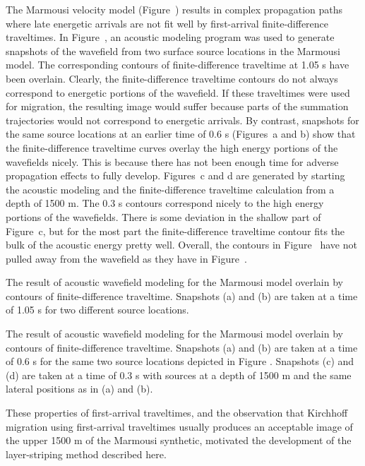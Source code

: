 The Marmousi velocity model (Figure~) results in
complex propagation paths where late energetic arrivals are not fit well 
by first-arrival finite-difference traveltimes.
In Figure~,
an acoustic modeling program was used to generate snapshots of 
the wavefield from two surface source locations in the Marmousi model.
The corresponding
contours of finite-difference traveltime at 1.05 s have been overlain.
Clearly, the finite-difference traveltime contours do not always correspond
to energetic portions of the wavefield. If these traveltimes were
used for migration, the resulting image would suffer because 
parts of the summation trajectories would not correspond to 
energetic arrivals. By contrast, snapshots for the same source locations
at an earlier time of 0.6 s (Figures~a and b)
show that the finite-difference traveltime curves overlay the
high energy portions of the wavefields nicely. This is because there 
has not been enough time for adverse propagation effects to fully develop.
Figures~c and d are generated by
starting the acoustic modeling and the finite-difference traveltime
calculation from a depth of 1500 m. The 0.3 s contours correspond nicely
to the high energy portions of the wavefields. There is some deviation
in the shallow part of Figure~c, but for the most part
the finite-difference traveltime contour fits the bulk of the acoustic 
energy pretty well. Overall, the contours in Figure~
have not pulled away from the wavefield as they have in Figure~.

{The result of acoustic wavefield modeling for the Marmousi model overlain
by contours of finite-difference traveltime. Snapshots (a) and (b) are
taken at a time of 1.05 s for two  different source locations.}

{The result of acoustic wavefield modeling for the Marmousi model overlain
by contours of finite-difference traveltime. Snapshots (a) and (b) are
taken at a time of 0.6 s for the same two source locations depicted
in Figure \protect {}. Snapshots (c) and (d) 
are taken at a time of 0.3 s with sources at a depth of 1500 m 
and the same lateral positions as in (a) and (b).}

These properties of first-arrival traveltimes, and the observation that
Kirchhoff migration using first-arrival traveltimes usually produces an
acceptable image of the upper 1500 m of the Marmousi synthetic, 
motivated the development of the layer-striping method described here.

